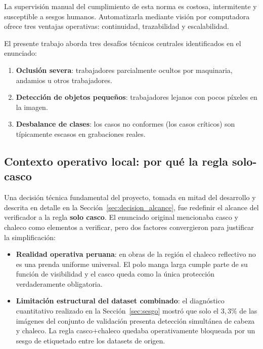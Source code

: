 \documentclass[11pt,a4paper]{article}
\begin{document}
La supervisión manual del cumplimiento de esta norma es costosa,
intermitente y susceptible a sesgos humanos. Automatizarla mediante
visión por computadora ofrece tres ventajas operativas: continuidad,
trazabilidad y escalabilidad.

El presente trabajo aborda tres desafíos técnicos centrales identificados
en el enunciado:

\begin{enumerate}
    \item \textbf{Oclusión severa}: trabajadores parcialmente ocultos por
    maquinaria, andamios u otros trabajadores.
    \item \textbf{Detección de objetos pequeños}: trabajadores lejanos
    con pocos píxeles en la imagen.
    \item \textbf{Desbalance de clases}: los casos no conformes (los
    casos críticos) son típicamente escasos en grabaciones reales.
\end{enumerate}

\subsection{Contexto operativo local: por qué la regla solo-casco}
\label{sec:contexto_local}

Una decisión técnica fundamental del proyecto, tomada en mitad del
desarrollo y descrita en detalle en la Sección~\ref{sec:decision_alcance},
fue redefinir el alcance del verificador a la regla \textbf{solo casco}.
El enunciado original mencionaba casco y chaleco como elementos a
verificar, pero dos factores convergieron para justificar la simplificación:

\begin{itemize}[leftmargin=*]
    \item \textbf{Realidad operativa peruana}: en obras de la región
    el chaleco reflectivo no es una prenda uniforme universal. El polo
    manga larga cumple parte de su función de visibilidad y el casco
    queda como la única protección verdaderamente obligatoria.
    \item \textbf{Limitación estructural del dataset combinado}: el
    diagnóstico cuantitativo realizado en la Sección~\ref{sec:sesgo}
    mostró que solo el $3{,}3\%$ de las imágenes del conjunto de
    validación presenta detección simultánea de cabeza y chaleco. La
    regla casco+chaleco quedaba operativamente bloqueada por un sesgo
    de etiquetado entre los datasets de origen.
\end{itemize}
\end{document}
